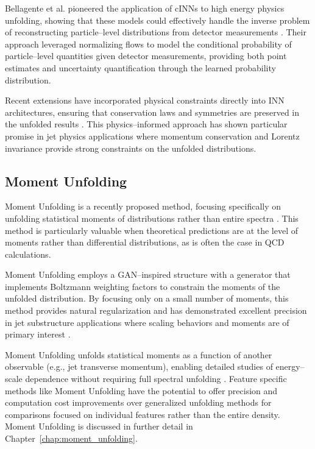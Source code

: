     Bellagente et al. pioneered the application of cINNs to high energy physics unfolding, showing that these models could effectively handle the inverse problem of reconstructing particle--level distributions from detector measurements .
    Their approach leveraged normalizing flows to model the conditional probability of particle--level quantities given detector measurements, providing both point estimates and uncertainty quantification through the learned probability distribution.

    Recent extensions have incorporated physical constraints directly into INN architectures, ensuring that conservation laws and symmetries are preserved in the unfolded results .
    This physics--informed approach has shown particular promise in jet physics applications where momentum conservation and Lorentz invariance provide strong constraints on the unfolded distributions.

    \subsection{Moment Unfolding}
    Moment Unfolding is a recently proposed method, focusing specifically on unfolding statistical moments of distributions rather than entire spectra .
    This method is particularly valuable when theoretical predictions are at the level of moments rather than differential distributions, as is often the case in QCD calculations.

    Moment Unfolding employs a GAN--inspired structure with a generator that implements Boltzmann weighting factors to constrain the moments of the unfolded distribution.
    By focusing only on a small number of moments, this method provides natural regularization and has demonstrated excellent precision in jet substructure applications where scaling behaviors and moments are of primary interest .

     Moment Unfolding unfolds statistical moments as a function of another observable (e.g., jet transverse momentum), enabling detailed studies of energy--scale dependence without requiring full spectral unfolding .
     Feature specific methods like Moment Unfolding have the potential to offer precision and computation cost improvements over generalized unfolding methods for comparisons focused on individual features rather than the entire density.
     Moment Unfolding is discussed in further detail in Chapter~\ref{chap:moment_unfolding}.


